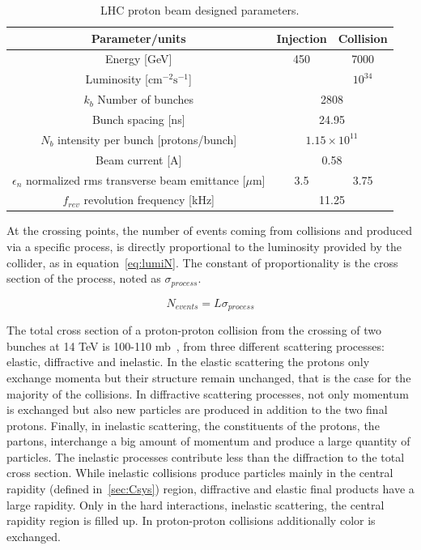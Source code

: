 \begin{table}[htbH]
\begin{center}
\caption{LHC proton beam designed parameters.\label{tab:LHCparams}}
\begin{tabular}{|c|c c|}
\hline 
Parameter/units & Injection & Collision \\
\hline
Energy [GeV]& 450 & 7000 \\ 
Luminosity [$\text{cm}^{-2}\text{s}^{-1}$] & & $10^{34}$ \\
$k_{b}$ Number of bunches & \multicolumn{2}{c|}{2808} \\
Bunch spacing [ns] & \multicolumn{2}{c|}{24.95} \\
$N_{b}$ intensity per bunch [protons/bunch] & \multicolumn{2}{c|}{$1.15\times 10^{11}$} \\
Beam current [A] & \multicolumn{2}{c|}{0.58} \\
$\epsilon_{n}$ normalized rms transverse beam emittance [$\mu$m] & 3.5 & 3.75 \\ 
$f_{rev}$ revolution frequency [kHz] & \multicolumn{2}{c|}{11.25} \\
\hline
\end{tabular}
\end{center}
\end{table}

At the crossing points, the number of events coming from collisions and produced via a specific process, is directly proportional to the luminosity provided by the collider, as in equation~\ref{eq:lumiN}. The constant of proportionality is the cross section of the process, noted as $\sigma_{process}$.

\begin{equation}
  \label{eq:lumiN}
  N_{events}=L\sigma_{process}
\end{equation} %

The total cross section of a proton-proton collision from the crossing of two bunches at 14 TeV is 100-110 mb~\cite{Augier:1993ta}, from three different scattering processes: elastic, diffractive and inelastic. In the elastic scattering the protons only exchange momenta but their structure remain unchanged, that is the case for the majority of the collisions. In diffractive scattering processes, not only momentum is exchanged but also new particles are produced in addition to the two final protons. Finally, in inelastic scattering, the constituents of the protons, the partons, interchange a big amount of momentum and produce a large quantity of particles. The inelastic processes contribute less than the diffraction to the total cross section. While inelastic collisions produce particles mainly in the central rapidity (defined in~\ref{sec:Csys}) region, diffractive and elastic final products have a large rapidity. Only in the hard interactions, inelastic scattering, the central rapidity region is filled up. In proton-proton collisions additionally color is exchanged.

